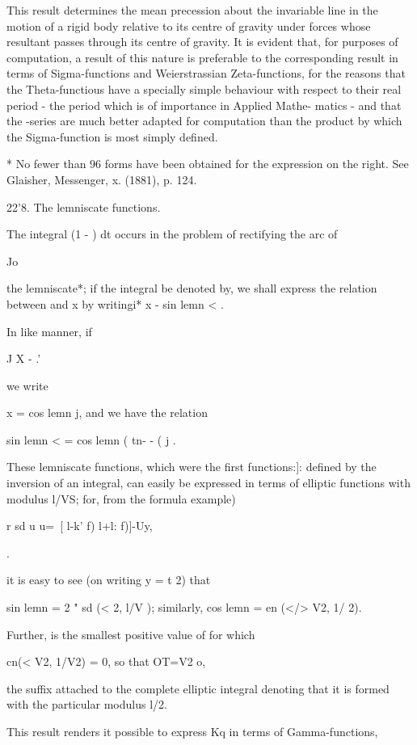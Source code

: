 This result determines the mean precession about the invariable line
in the motion of a rigid body relative to its centre of gravity under
forces whose resultant passes through its centre of gravity. It is
evident that, for purposes of computation, a result of this nature is
preferable to the corresponding result in terms of Sigma-functions and
Weierstrassian Zeta-functions, for the reasons that the
Theta-functious have a specially simple behaviour with respect to
their real period - the period which is of importance in Applied
Mathe- matics - and that the -series are much better adapted for
computation than the product by which the Sigma-function is most
simply defined.

* No fewer than 96 forms have been obtained for the expression on the
right. See Glaisher, Messenger, x. (1881), p. 124.

%
%

22'8. The lemniscate functions.

The integral (1 - ) dt occurs in the problem of rectifying the arc of

Jo

the lemniscate*; if the integral be denoted by, we shall express the
relation between and x by writingi* x - sin lemn < .

In like manner, if

J X - .'

we write

x = cos lemn j, and we have the relation

sin lemn < = cos lemn ( tn- - ( j .

These lemniscate functions, which were the first functions:]: defined
by the inversion of an integral, can easily be expressed in terms of
elliptic functions with modulus l/VS; for, from the formula 
example)

r sd u u=\ [ l-k' f) l+l: f)]-Uy,

.

it is easy to see (on writing y = t \/2) that

sin lemn = 2 " sd (< \/2, l/V ); similarly, cos lemn = en (</> V2, 1/
2).

Further, is the smallest positive value of for which

cn(< V2, 1/V2) = 0, so that OT=V2 o,

the suffix attached to the complete elliptic integral denoting that it
is formed with the particular modulus l/\/2.

This result renders it possible to express Kq in terms of
Gamma-functions,

